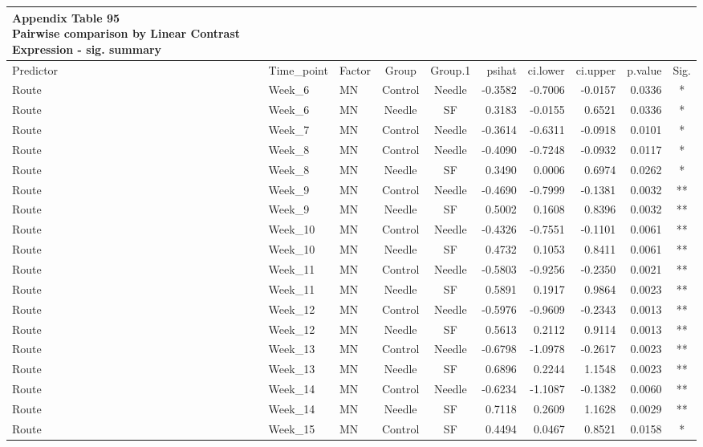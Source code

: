 \documentclass[
  12pt,
  letterpaper,
]{article}
\begin{document}
\begin{longtable}{lllccrrrrc}
\caption*{
{\large \textbf{Appendix Table 95}} \\ 
{\small \textbf{Pairwise comparison by Linear Contrast Expression - sig. summary}}
} \\ 
\toprule
Predictor & Time\_point & Factor & Group & Group.1 & psihat & ci.lower & ci.upper & p.value & Sig. \\ 
\midrule\addlinespace[2.5pt]
Route & Week\_6 & MN & Control & Needle & -0.3582 & -0.7006 & -0.0157 & 0.0336 & * \\ 
Route & Week\_6 & MN & Needle & SF & 0.3183 & -0.0155 & 0.6521 & 0.0336 & * \\ 
Route & Week\_7 & MN & Control & Needle & -0.3614 & -0.6311 & -0.0918 & 0.0101 & * \\ 
Route & Week\_8 & MN & Control & Needle & -0.4090 & -0.7248 & -0.0932 & 0.0117 & * \\ 
Route & Week\_8 & MN & Needle & SF & 0.3490 & 0.0006 & 0.6974 & 0.0262 & * \\ 
Route & Week\_9 & MN & Control & Needle & -0.4690 & -0.7999 & -0.1381 & 0.0032 & ** \\ 
Route & Week\_9 & MN & Needle & SF & 0.5002 & 0.1608 & 0.8396 & 0.0032 & ** \\ 
Route & Week\_10 & MN & Control & Needle & -0.4326 & -0.7551 & -0.1101 & 0.0061 & ** \\ 
Route & Week\_10 & MN & Needle & SF & 0.4732 & 0.1053 & 0.8411 & 0.0061 & ** \\ 
Route & Week\_11 & MN & Control & Needle & -0.5803 & -0.9256 & -0.2350 & 0.0021 & ** \\ 
Route & Week\_11 & MN & Needle & SF & 0.5891 & 0.1917 & 0.9864 & 0.0023 & ** \\ 
Route & Week\_12 & MN & Control & Needle & -0.5976 & -0.9609 & -0.2343 & 0.0013 & ** \\ 
Route & Week\_12 & MN & Needle & SF & 0.5613 & 0.2112 & 0.9114 & 0.0013 & ** \\ 
Route & Week\_13 & MN & Control & Needle & -0.6798 & -1.0978 & -0.2617 & 0.0023 & ** \\ 
Route & Week\_13 & MN & Needle & SF & 0.6896 & 0.2244 & 1.1548 & 0.0023 & ** \\ 
Route & Week\_14 & MN & Control & Needle & -0.6234 & -1.1087 & -0.1382 & 0.0060 & ** \\ 
Route & Week\_14 & MN & Needle & SF & 0.7118 & 0.2609 & 1.1628 & 0.0029 & ** \\ 
Route & Week\_15 & MN & Control & SF & 0.4494 & 0.0467 & 0.8521 & 0.0158 & * \\ 

\end{longtable}
\end{document}
